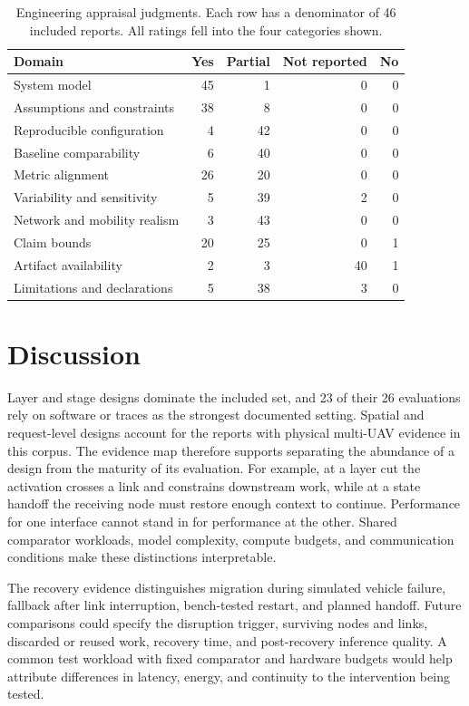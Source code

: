 \documentclass[pdflatex,sn-vancouver-num]{sn-jnl}
\begin{document}
\begin{table}[tb]
\caption{Engineering appraisal judgments. Each row has a denominator of 46 included reports. All ratings fell into the four categories shown.}\label{tab:appraisal}
\centering\small
\begin{tabular}{@{}p{.46\linewidth}rrrr@{}}
\toprule
Domain & Yes & Partial & Not reported & No\\
\midrule
System model & 45 & 1 & 0 & 0\\
Assumptions and constraints & 38 & 8 & 0 & 0\\
Reproducible configuration & 4 & 42 & 0 & 0\\
Baseline comparability & 6 & 40 & 0 & 0\\
Metric alignment & 26 & 20 & 0 & 0\\
Variability and sensitivity & 5 & 39 & 2 & 0\\
Network and mobility realism & 3 & 43 & 0 & 0\\
Claim bounds & 20 & 25 & 0 & 1\\
Artifact availability & 2 & 3 & 40 & 1\\
Limitations and declarations & 5 & 38 & 3 & 0\\
\bottomrule
\end{tabular}
\end{table}

\section{Discussion}\label{sec:discussion}
Layer and stage designs dominate the included set, and 23 of their 26 evaluations rely on software or traces as the strongest documented setting. Spatial and request-level designs account for the reports with physical multi-UAV evidence in this corpus. The evidence map therefore supports separating the abundance of a design from the maturity of its evaluation. For example, at a layer cut the activation crosses a link and constrains downstream work, while at a state handoff the receiving node must restore enough context to continue. Performance for one interface cannot stand in for performance at the other. Shared comparator workloads, model complexity, compute budgets, and communication conditions make these distinctions interpretable.

The recovery evidence distinguishes migration during simulated vehicle failure, fallback after link interruption, bench-tested restart, and planned handoff. Future comparisons could specify the disruption trigger, surviving nodes and links, discarded or reused work, recovery time, and post-recovery inference quality. A common test workload with fixed comparator and hardware budgets would help attribute differences in latency, energy, and continuity to the intervention being tested.
\end{document}
